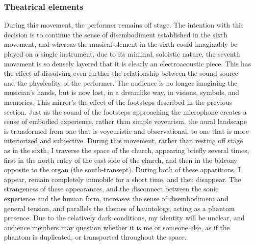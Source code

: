\documentclass[12pt,twoside,maitrise]{dms}
\theoremstyle{definition}
\begin{document}
\subsubsection{Theatrical elements}

During this movement, the performer remains off stage.
The intention with this decision is to continue the sense of disembodiment established in the sixth movement, and whereas the musical element in the sixth could imaginably be played on a single instrument, due to its minimal, soloistic nature, the seventh movement is so densely layered that it is clearly an electroacoustic piece.
This has the effect of dissolving even further the relationship between the sound source and the physicality of the performer.
The audience is no longer imagining the musician's hands, but is now lost, in a dreamlike way, in visions, symbols, and memories.
This mirror's the effect of the footsteps described in the previous section.
Just as the sound of the footsteps approaching the microphone creates a sense of embodied experience, rather than simple voyeurism, the aural landscape is transformed from one that is voyeuristic and observational, to one that is more interiorized and subjective.
During this movement, rather than resting off stage as in the sixth, I traverse the space of the church, appearing briefly several times, first in the north entry of the east side of the church, and then in the balcony opposite to the organ (the south-transept).
During both of these apparitions, I appear, remain completely immobile for a short time, and then disappear.
The strangeness of these appearances, and the disconnect between the sonic experience and the human form, increases the sense of disembodiment and general tension, and parallels the themes of hauntology, acting as a phantom presence.
Due to the relatively dark conditions, my identity will be unclear, and audience members may question whether it is me or someone else, as if the phantom is duplicated, or transported throughout the space.
\end{document}
